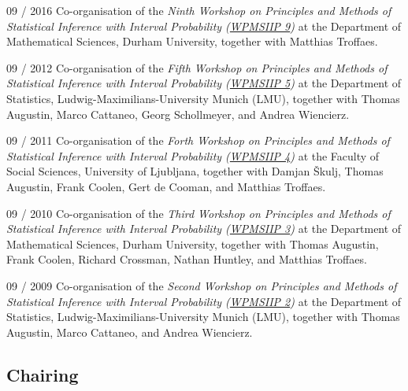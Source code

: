 \documentclass[a4paper]{simplecv}
\begin{document}
\begin{topic}
\item[09 / 2016] Co-organisation of the \emph{Ninth Workshop on Principles and Methods of Statistical Inference with Interval Probability (\href{http://www.maths.dur.ac.uk/users/matthias.troffaes/wpmsiip2016/index.html}{WPMSIIP 9})}
                 at the Department of Mathematical Sciences, Durham University,
                 together with Matthias Troffaes.

\item[09 / 2012] Co-organisation of the \emph{Fifth Workshop on Principles and Methods of Statistical Inference with Interval Probability (\href{http://www.statistik.lmu.de/institut/ag/statsoz_neu/research/WPMSIIP_2012/}{WPMSIIP 5})}
                 at the Department of Statistics, Ludwig-Maximilians-University Munich (LMU),
                 together with Thomas Augustin, Marco Cattaneo, Georg Schollmeyer, and Andrea Wiencierz.
                 
\item[09 / 2011] Co-organisation of the \emph{Forth Workshop on Principles and Methods of Statistical Inference with Interval Probability (\href{http://wpmsiip2011.fdvinfo.net/c/646/Information/}{WPMSIIP 4})}
                 at the Faculty of Social Sciences, University of Ljubljana,
                 together with Damjan \v{S}kulj, Thomas Augustin, Frank Coolen, Gert de Cooman, and Matthias Troffaes.

\item[09 / 2010] Co-organisation of the \emph{Third Workshop on Principles and Methods of Statistical Inference with Interval Probability (\href{http://www.maths.dur.ac.uk/users/matthias.troffaes/wpmsiip2010/}{WPMSIIP 3})}
                 at the Department of Mathematical Sciences, Durham University,
                 together with Thomas Augustin, Frank Coolen, Richard Crossman, Nathan Huntley, and Matthias Troffaes.

\item[09 / 2009] Co-organisation of the \emph{Second Workshop on Principles and Methods of Statistical Inference with Interval Probability (\href{http://www.stat.uni-muenchen.de/~walter/workshop0909/}{WPMSIIP 2})}
                 at the Department of Statistics, Ludwig-Maximilians-University Munich (LMU),
                 together with Thomas Augustin, Marco Cattaneo, and Andrea Wiencierz.
\end{topic}

\subsection{Chairing}
\end{document}

